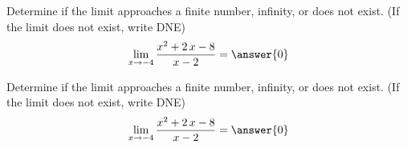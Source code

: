 \documentclass[handout]{ximera}
\begin{document}

\begin{problem}
Determine if the limit approaches a finite number, infinity, or does not exist. (If the limit does not exist, write DNE)
\[\lim_{x\to{{-4}}}\dfrac{{{x^{2} + 2 \, x - 8}}}{{{x - 2}}}=\answer{0}\]
\end{problem}%


\begin{problem}
Determine if the limit approaches a finite number, infinity, or does not exist. (If the limit does not exist, write DNE)
\[\lim_{x\to{{-4}}}\dfrac{{{x^{2} + 2 \, x - 8}}}{{{x - 2}}}=\answer{0}\]
\end{problem}%










\end{document}
